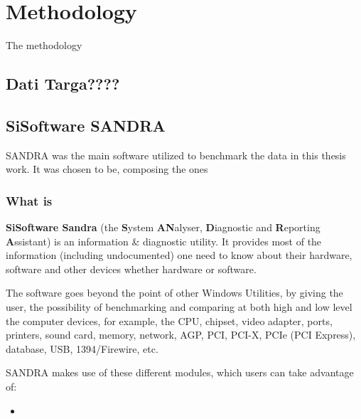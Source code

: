 

\chapter{Methodology} \label{chap3:methodology}
    The methodology

\section{Dati Targa????} \label{sec3:}

\section{SiSoftware SANDRA} \label{sec3:sandra}
    SANDRA was the main software utilized to benchmark the data in this thesis work. It was chosen to be, composing the ones 
    
\subsection{What is} \label{subsec3:whatis_sandra}

	\textbf{SiSoftware Sandra} (the \textbf{S}ystem \textbf{AN}alyser, \textbf{D}iagnostic and \textbf{R}eporting \textbf{A}ssistant) is an information \& diagnostic utility. It provides most of the information (including undocumented) one need to know about their hardware, software and other devices whether hardware or software.
    
	The software goes beyond the point of other Windows Utilities, by giving the user, the possibility of benchmarking and comparing at both high and low level the computer devices, for example, the CPU, chipset, video adapter, ports, printers, sound card, memory, network, AGP, PCI, PCI-X, PCIe (PCI Express), database, USB, 1394/Firewire, etc.
    
	SANDRA makes use of these different modules, which users can take advantage of:

\begin{itemize}
	\item 
\end{itemize}

